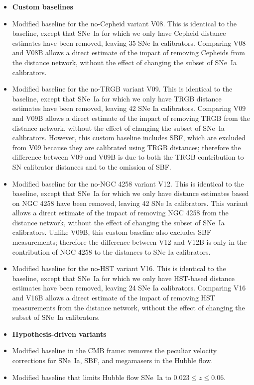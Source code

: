 \begin{itemize}
    \smallskip\item[]\textbf{Custom baselines}
    \item[V08B] Modified baseline for the no-Cepheid variant V08.  This is identical to the baseline, except that SNe~Ia for which we only have Cepheid distance estimates have been removed, leaving 35 SNe Ia calibrators.  Comparing V08 and V08B allows a direct estimate of the impact of removing Cepheids from the distance network, without the effect of changing the subset of SNe~Ia calibrators.
    \item[V09B] Modified baseline for the no-TRGB variant V09. This is identical to the baseline, except that SNe~Ia for which we only have TRGB distance estimates have been removed, leaving 42 SNe Ia calibrators. Comparing V09 and V09B allows a direct estimate of the impact of removing TRGB from the distance network, without the effect of changing the subset of SNe~Ia calibrators. However, this custom baseline includes SBF, which are excluded from V09 because they are calibrated using TRGB distances; therefore the difference between V09 and V09B is due to both the TRGB contribution to SN calibrator distances and to the omission of SBF.
    \item[V12B] Modified baseline for the no-NGC 4258 variant V12.  This is identical to the baseline, except that SNe~Ia for which we only have  distance estimates based on NGC 4258 have been removed, leaving 42 SNe Ia calibrators.  This variant allows a direct estimate of the impact of removing NGC 4258 from the distance network, without the effect of changing the subset of SNe~Ia calibrators.  Unlike V09B, this custom baseline also excludes SBF measurements;
    therefore the difference between V12 and V12B is only in the contribution of NGC 4258 to the distances to SNe Ia calibrators.  
    \item[V16B] Modified baseline for the no-HST variant V16. This is identical to the baseline, except that SNe~Ia for which we only have HST-based distance estimates have been removed, leaving 24 SNe Ia calibrators. Comparing V16 and V16B allows a direct estimate of the impact of removing HST measurements from the distance network, without the effect of changing the subset of SNe~Ia calibrators.
    \smallskip\item[]\textbf{Hypothesis-driven variants} 
    \item[V19] Modified baseline in the CMB frame: removes the peculiar velocity corrections for SNe~Ia, SBF, and megamasers in the Hubble flow.
    \item[V20] Modified baseline that limits Hubble flow SNe~Ia to $ 0.023 \leq z \leq 0.06 $.

\end{itemize}
